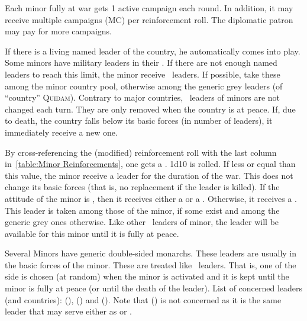 \aparag[Campaigns]
\bparag Each minor fully at war gets 1 active campaign each round.
\bparag In addition, it may receive multiple campaigns (MC) per reinforcement
roll.
\bparag The diplomatic patron may pay for more campaigns.

\bparag If there is a living named leader of the country, he automatically
comes into play.
\bparag Some minors have military leaders in their . If
there are not enough named leaders to reach this limit, the minor receive
\anonyme\ leaders. If possible, take these among the minor country pool,
otherwise among the generic grey leaders (of ``country'' \textsc{Quidam}).
\bparag Contrary to major countries, \anonyme\ leaders of minors are not
changed each turn. They are only removed when the country is at peace. If, due
to death, the country falls below its basic forces (in number of leaders), it
immediately receive a new one.

\bparag By cross-referencing the (modified) reinforcement roll with the last
column in~\ref{table:Minor Reinforcements}, one gets a .
\bparag 1d10 is rolled. If less or equal than this value, the minor receive a
leader for the duration of the war. This does not change its basic forces
(that is, no replacement if the leader is killed).
\bparag If the attitude of the minor is , then it receives either
a \anonyme\LeaderA or a \anonyme\LeaderG. Otherwise, it receives a
\anonyme\LeaderG.
\bparag This leader is taken among those of the minor, if some exist and among
the generic grey ones otherwise.
\bparag Like other \anonyme\ leaders of minor, the leader will be available
for this minor until it is fully at peace.

\bparag Several Minors have generic double-sided monarchs. These leaders are
usually in the basic forces of the minor.
\bparag These are treated like \anonyme\ leaders. That is, one of the side is
chosen (at random) when the minor is activated and it is kept until the minor
is fully at peace (or until the death of the leader).
\bparag List of concerned leaders (and countries): 
(\paysMamelouks),  (\paysCrimee) and 
(\paysPerse).
\bparag Note that  (\paysChevaliers) is not concerned as
it is the same leader that may serve either as \LeaderG or \LeaderA.

